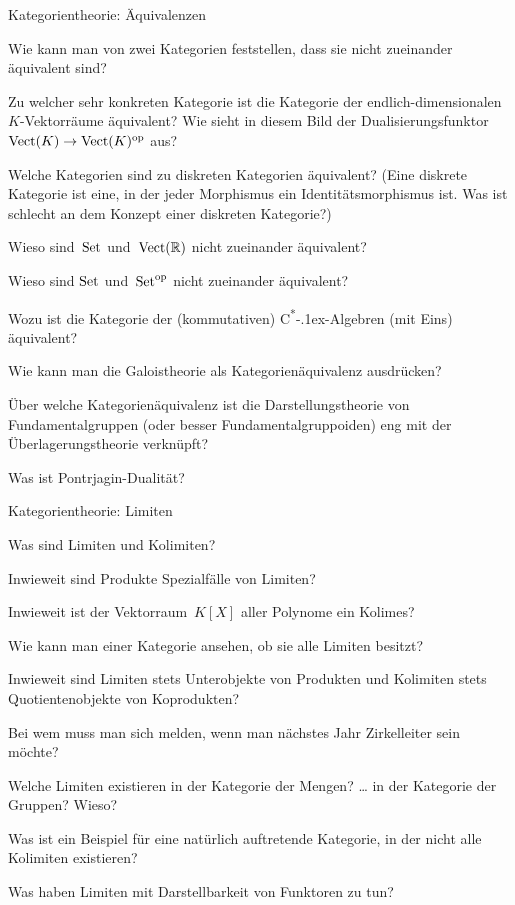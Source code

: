 \documentclass{uebblatt}
\begin{document}
\begin{aufgabeE}{Kategorientheorie: Äquivalenzen}
\item Wie kann man von zwei Kategorien feststellen, dass sie nicht zueinander
äquivalent sind?
\item Zu welcher sehr konkreten Kategorie ist die Kategorie der
endlich-dimensionalen~$K$-Vektorräume äquivalent? Wie sieht in diesem Bild der
Dualisierungsfunktor~$\mathrm{Vect}(K) \to \mathrm{Vect}(K)^{\mathrm{op}}$ aus?
\item Welche Kategorien sind zu diskreten Kategorien äquivalent? (Eine diskrete
Kategorie ist eine, in der jeder Morphismus ein Identitätsmorphismus ist. Was
ist schlecht an dem Konzept einer diskreten Kategorie?)
\item Wieso sind~$\mathrm{Set}$ und~$\mathrm{Vect}(\mathbb{R})$ nicht zueinander äquivalent?
\item Wieso sind $\mathrm{Set}$ und~$\mathrm{Set}^{\mathrm{op}}$ nicht zueinander äquivalent?
\item Wozu ist die Kategorie der (kommutativen)
C\textsuperscript{*}\kern-.1ex-Algebren (mit Eins) äquivalent?
\item Wie kann man die Galoistheorie als Kategorienäquivalenz ausdrücken?
\item Über welche Kategorienäquivalenz ist die Darstellungstheorie von
Fundamentalgruppen (oder besser Fundamentalgruppoiden) eng mit der
Überlagerungstheorie verknüpft?
\item Was ist Pontrjagin-Dualität?
\end{aufgabeE}

\begin{aufgabeE}{Kategorientheorie: Limiten}
\item Was sind Limiten und Kolimiten?
\item Inwieweit sind Produkte Spezialfälle von Limiten?
\item Inwieweit ist der Vektorraum~$K[X]$ aller Polynome ein Kolimes?
\item Wie kann man einer Kategorie ansehen, ob sie alle Limiten besitzt?
\item Inwieweit sind Limiten stets Unterobjekte von Produkten und Kolimiten
stets Quotientenobjekte von Koprodukten?
\item Bei wem muss man sich melden, wenn man nächstes Jahr Zirkelleiter sein
möchte?
\item Welche Limiten existieren in der Kategorie der Mengen? \ldots{} in der
Kategorie der Gruppen? Wieso?
\item Was ist ein Beispiel für eine natürlich auftretende Kategorie, in der
nicht alle Kolimiten existieren?
\item Was haben Limiten mit Darstellbarkeit von Funktoren zu tun?
\end{aufgabeE}
\end{document}
